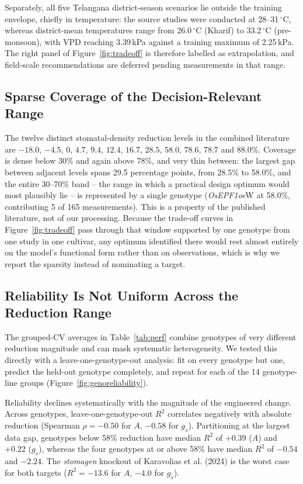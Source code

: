 \documentclass[runningheads]{llncs}
\begin{document}
Separately, all five Telangana district-season scenarios lie outside the training envelope, chiefly in temperature: the source studies were conducted at 28--31$\,^{\circ}$C, whereas district-mean temperatures range from 26.0$\,^{\circ}$C (Kharif) to 33.2$\,^{\circ}$C (pre-monsoon), with VPD reaching 3.39\,kPa against a training maximum of 2.25\,kPa. The right panel of Figure~\ref{fig:tradeoff} is therefore labelled as extrapolation, and field-scale recommendations are deferred pending measurements in that range.

\subsection{Sparse Coverage of the Decision-Relevant Range}\label{sec:gap}

The twelve distinct stomatal-density reduction levels in the combined literature are $-18.0$, $-4.5$, $0$, $4.7$, $9.4$, $12.4$, $16.7$, $28.5$, $58.0$, $78.6$, $78.7$ and $88.0$\%. Coverage is dense below 30\% and again above 78\%, and very thin between: the largest gap between adjacent levels spans 29.5 percentage points, from 28.5\% to 58.0\%, and the entire 30--70\% band -- the range in which a practical design optimum would most plausibly lie -- is represented by a single genotype (\textit{OsEPF1oe}W at 58.0\%, contributing 5 of 165 measurements). This is a property of the published literature, not of our processing. Because the trade-off curves in Figure~\ref{fig:tradeoff} pass through that window supported by one genotype from one study in one cultivar, any optimum identified there would rest almost entirely on the model's functional form rather than on observations, which is why we report the sparsity instead of nominating a target.

\subsection{Reliability Is Not Uniform Across the Reduction Range}\label{sec:genoreliability}

The grouped-CV averages in Table~\ref{tab:perf} combine genotypes of very different reduction magnitude and can mask systematic heterogeneity. We tested this directly with a leave-one-genotype-out analysis: fit on every genotype but one, predict the held-out genotype completely, and repeat for each of the 14 genotype-line groups (Figure~\ref{fig:genoreliability}).

Reliability declines systematically with the magnitude of the engineered change. Across genotypes, leave-one-genotype-out $R^{2}$ correlates negatively with absolute reduction (Spearman $\rho=-0.50$ for $A$, $-0.58$ for $g_s$). Partitioning at the largest data gap, genotypes below 58\% reduction have median $R^{2}$ of $+0.39$ ($A$) and $+0.22$ ($g_s$), whereas the four genotypes at or above 58\% have median $R^{2}$ of $-0.54$ and $-2.24$. The \textit{stomagen} knockout of Karavolias et al. (2024) is the worst case for both targets ($R^{2}=-13.6$ for $A$, $-4.0$ for $g_s$).
\end{document}
